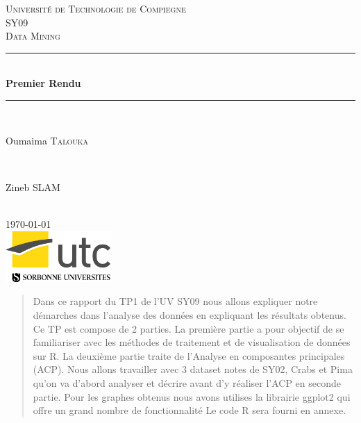 \documentclass[]{report}
\begin{document}
	
\begin{titlepage}
	
	\newcommand{\HRule}{\rule{\linewidth}{0.5mm}} 
	
	\center 
	
	\textsc{\LARGE Université de Technologie de Compiegne}\\[1.5cm]
	\textsc{\Large SY09}\\[0.5cm] 
	\textsc{\large Data Mining}\\[0.5cm]
		
	\HRule \\[0.4cm]
	{ \huge \bfseries Premier Rendu}\\[0.4cm] 
	\HRule \\[1.5cm]
		
	\begin{minipage}{0.4\textwidth}
		\begin{flushleft} \large
			Oumaima \textsc{Talouka} 
		\end{flushleft}
	\end{minipage}
	~
	\begin{minipage}{0.4\textwidth}
		\begin{flushright} \large
			Zineb \textsc{SLAM} 
		\end{flushright}
	\end{minipage}\\[2cm]

	{\large \today}\\[2cm] 

	\includegraphics[width=40mm]{Figures/utc.jpg}\\ %

	\vfill
	
\end{titlepage}



\begin{abstract}
Dans ce rapport du TP1 de l'UV SY09 nous allons expliquer notre démarches dans l'analyse des données en expliquant les résultats obtenus. Ce TP est compose de 2 parties. La première partie a pour objectif de se familiariser avec les méthodes de traitement et de visualisation de données sur R. La deuxième partie traite de l'Analyse en composantes principales (ACP). Nous allons travailler avec 3 dataset notes de SY02, Crabs et Pima qu'on va d'abord analyser et décrire avant d'y réaliser l'ACP en seconde partie. Pour les graphes obtenus nous avons utilises la librairie ggplot2 qui offre un grand nombre de fonctionnalité Le code R sera fourni en annexe.

\end{abstract}
\end{document}
